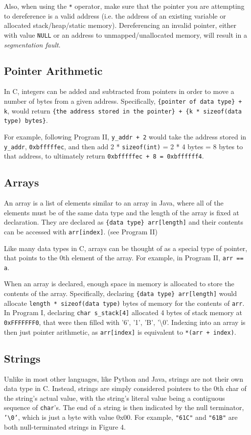 \documentclass{article}
\begin{document}
Also, when using the \texttt{*} operator, make sure that the pointer you are attempting to dereference is a valid address (i.e. the address of an existing variable or allocated stack/heap/static memory). Dereferencing an invalid pointer, either with value \texttt{NULL} or an address to unmapped/unallocated memory, will result in a \textit{segmentation fault}.

\subsection{Pointer Arithmetic}
In C, integers can be added and subtracted from pointers in order to move a number of bytes from a given address. Specifically, \texttt{\{pointer of data type\} + k}, would return \texttt{\{the address stored in the pointer\} + \{k * sizeof(data type) bytes\}}. 

For example, following Program II, \texttt{y\_addr + 2} would take the address stored in \texttt{y\_addr}, \texttt{0xbfffffec}, and then add 2 * \texttt{sizeof(int)} = 2 * 4 bytes = 8 bytes to that address, to ultimately return \texttt{0xbfffffec + 8 = 0xbffffff4}. 

\subsection{Arrays}
An array is a list of elements similar to an array in Java, where all of the elements must be of the same data type and the length of the array is fixed at declaration. They are declared as \texttt{\{data type\} arr[length]} and their contents can be accessed with \texttt{arr[index]}. (see Program II)

Like many data types in C, arrays can be thought of as a special type of pointer, that points to the 0th element of the array.  For example, in Program II, \texttt{arr == a}.

When an array is declared, enough space in memory is allocated to store the contents of the array. Specifically, declaring \texttt{\{data type\} arr[length]} would allocate \texttt{length * sizeof(data type)} bytes of memory for the contents of \texttt{arr}. In Program I, declaring \texttt{char s\_stack[4]} allocated 4 bytes of stack memory at \texttt{0xFFFFFFF0}, that were then filled with '6', '1', 'B', '\textbackslash0'. Indexing into an array is then just pointer arithmetic, as \texttt{arr[index]} is equivalent to \texttt{*(arr + index)}.

\subsection{Strings} 
Unlike in most other languages, like Python and Java, strings are not their own data type in C. Instead, strings are simply considered pointers to the 0th char of the string's actual value, with the string's literal value being a contiguous sequence of \texttt{char}'s. The end of a string is then indicated by the null terminator, \texttt{'\textbackslash0'}, which is just a byte with value 0x00. For example, \texttt{"61C"} and \texttt{"61B"} are both null-terminated strings in Figure 4.
\end{document}
